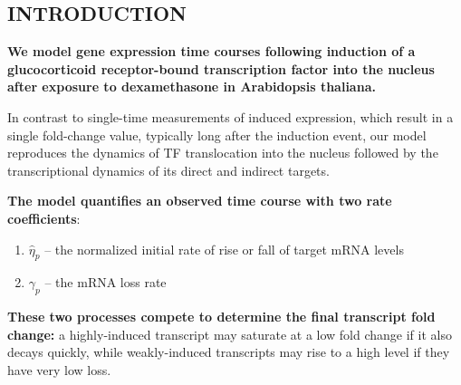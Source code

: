 \documentclass[aspb,landscape]{a0poster}
\begin{document}
\begin{multicols}{3} %

  \color{Black} %




  {
    \titlespacing{\section}{0pt}{0pt}{0pt}
    \section*{INTRODUCTION}

    \textbf{We model gene expression time courses following induction of a glucocorticoid receptor-bound transcription factor into the nucleus after exposure to dexamethasone in Arabidopsis thaliana.}
    
    In contrast to single-time measurements of induced expression, which result in a single fold-change value, typically long after the induction event,
    our model reproduces the dynamics of TF translocation into the nucleus followed by the transcriptional dynamics of its direct and indirect targets.
    
    \textbf{The model quantifies an observed time course with two rate coefficients}:
    \begin{enumerate}
    \item $\hat{\eta}_p$ -- the normalized initial rate of rise or fall of target mRNA levels
    \item $\gamma_p$ -- the mRNA loss rate
    \end{enumerate}
    \textbf{These two processes compete to determine the final transcript fold change:} a highly-induced transcript may saturate at a low fold change if it also decays quickly,
    while weakly-induced transcripts may rise to a high level if they have very low loss.
    
}
\end{multicols}
\end{document}
